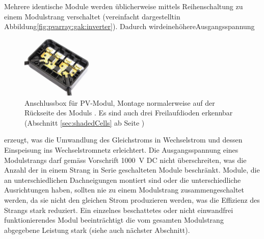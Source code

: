 Mehrere  identische  Module  werden  \"ublicherweise  mittels  Reihenschaltung
zu  einem  Modulstrang  verschaltet  (vereinfacht  dargestellt\hfill  in\hfill
Abbildung\hfill    \ref{fig:pvarray:gak:inverter}).    \hfill    Dadurch\hfill
wird\hfill eine\hfill h\"ohere\hfill Ausgangsspannung

\begin{figure}
    \centering
    \includegraphics[width=0.3\textwidth]{images/solar-facility/pvJunctionBox.jpeg}
    \caption[Anschlussbox PV-Modul]{
        Anschlussbox   f\"ur   PV-Modul,   Montage   normalerweise   auf   der
        R\"uckseite  des  Moduls  \cite{ref:junctionBox}. Es  sind  auch  drei
        Freilaufdioden  erkennbar  (Abschnitt \ref{sec:shadedCells}  ab  Seite
        \pageref{sec:shadedCells})%
    }
    \label{fig:pvJunctionBox}
\end{figure}

\noindent erzeugt,  was die  Umwandlung des  Gleichstroms in  Wechselstrom und
dessen  Einspeisung  ins  Wechselstromnetz  erleichtert. Die  Ausgangsspannung
eines  Modulstrangs   darf  gem\"ass  Vorschrift  \SI{1000}{\volt}   DC  nicht
\"uberschreiten,  was die  Anzahl der  in einem  Strang in  Serie geschalteten
Module beschr\"ankt.  Module, die  an unterschiedlichen Dachneigungen montiert
sind  oder die  unterschiedliche  Ausrichtungen haben,  sollten  nie zu  einem
Modulstrang  zusammengeschaltet  werden,  da  sie  nicht  den  gleichen  Strom
produzieren  werden,  was  die  Effizienz  des  Strangs  stark  reduziert. Ein
einzelnes   beschattetes  oder   nicht   einwandfrei  funktionierendes   Modul
beeintr\"achtigt die vom gesamten Modulstrang abgegebene Leistung stark (siehe
auch n\"achster Abschnitt).



